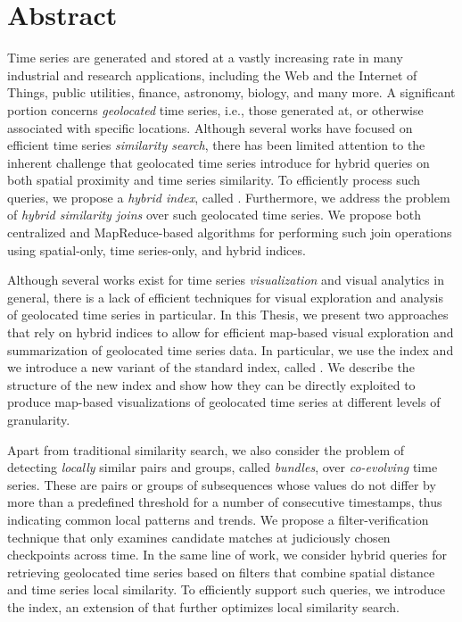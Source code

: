 
\chapter{Abstract} \label{chap:abstract}

Time series are generated and stored at a vastly increasing rate in many industrial and research applications, including the Web and the Internet of Things, public utilities, finance, astronomy, biology, and many more. A significant portion concerns \textit{geolocated} time series, i.e., those generated at, or otherwise associated with specific locations. Although several works have focused on efficient time series \textit{similarity search}, there has been limited attention to the inherent challenge that geolocated time series introduce for hybrid queries on both spatial proximity and time series similarity. To efficiently process such queries, we propose a \textit{hybrid index}, called \btsr. Furthermore, we address the problem of \textit{hybrid similarity joins} over such geolocated time series. We propose both centralized and MapReduce-based algorithms for performing such join operations using spatial-only, time series-only, and hybrid indices.

Although several works exist for time series \textit{visualization} and visual analytics in general, there is a lack of efficient techniques for visual exploration and analysis of geolocated time series in particular. In this Thesis, we present two approaches that rely on hybrid indices to allow for efficient map-based visual exploration and summarization of geolocated time series data. In particular, we use the \btsr index and we introduce a new variant of the standard \isax index, called \hisax. We describe the structure of the new index and show how they can be directly exploited to produce map-based visualizations of geolocated time series at different levels of granularity. 

Apart from traditional similarity search, we also consider the problem of detecting \textit{locally} similar pairs and groups, called \textit{bundles}, over \textit{co-evolving} time series. These are pairs or groups of subsequences whose values do not differ by more than a predefined threshold for a number of consecutive timestamps, thus indicating common local patterns and trends. We propose a filter-verification technique that only examines candidate matches at judiciously chosen checkpoints across time. In the same line of work, we consider hybrid queries for retrieving geolocated time series based on filters that combine spatial distance and time series local similarity. To efficiently support such queries, we introduce the \sbtsr index, an extension of \btsr that further optimizes local similarity search.

